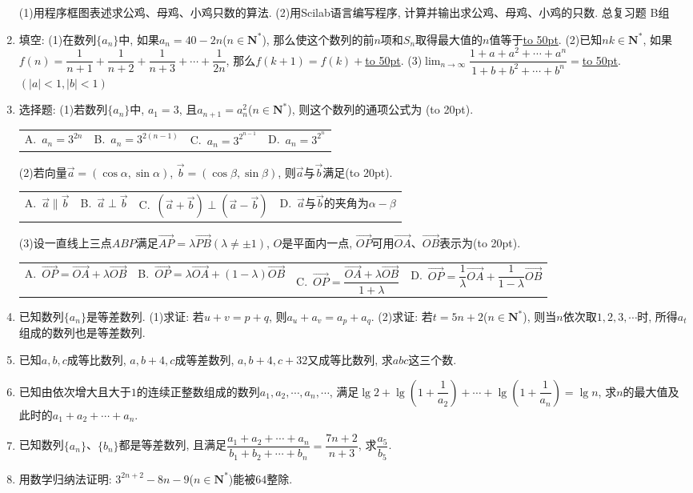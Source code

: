\documentclass[10pt,a4paper]{article}
\newcommand{\blank}[1]{\underline{\hbox to #1pt{}}}
\newcommand{\bracket}[1]{(\hbox to #1pt{})}
\newcommand{\fourch}[4]{\par\begin{tabular}{p{.23\textwidth}p{.23\textwidth}p{.23\textwidth}p{.23\textwidth}}
A.~#1 &B.~#2& C.~#3& D.~#4
\end{tabular}}
\begin{document}
\begin{enumerate}[1.]
(1)用程序框图表述求公鸡、母鸡、小鸡只数的算法.
(2)用Scilab语言编写程序, 计算并输出求公鸡、母鸡、小鸡的只数.
总复习题
B组
\item 填空:
(1)在数列$\{a_n\}$中, 如果$a_n=40-2n$($n\in \mathbf{N}^*$), 那么使这个数列的前$n$项和$S_n$取得最大值的$n$值等于\blank{50}.
(2)已知$nk\in \mathbf{N}^*$, 如果$f(n)=\dfrac 1{n+1}+\dfrac 1{n+2}+\dfrac 1{n+3}+\cdots +\dfrac 1{2n}$, 那么$f(k+1)=f(k)+$\blank{50}.
(3)$\displaystyle\lim_{n\to\infty}\dfrac{1+a+a^2+\cdots +a^n}{1+b+b^2+\cdots +b^n}=$\blank{50}.$(|a|<1,|b|<1)$
\item 选择题:
(1)若数列$\{a_n\}$中, $a_1=3$, 且$a_{n+1}=a_n^2$($n\in \mathbf{N}^*$), 则这个数列的通项公式为    \bracket{20}.
\fourch{$a_n=3^{2n}$}{$a_n=3^{2(n-1)}$}{$a_n=3^{2^{n-1}}$}{$a_n=3^{2^n}$}
(2)若向量$\overrightarrow a=(\cos \alpha ,\sin \alpha)$, $\overrightarrow b=(\cos \beta ,\sin \beta)$, 则$\overrightarrow a$与$\overrightarrow b$满足\bracket{20}.
\fourch{$\overrightarrow a\parallel \overrightarrow b$}{$\overrightarrow a\perp \overrightarrow b$}{$(\overrightarrow a+\overrightarrow b)\perp (\overrightarrow a-\overrightarrow b)$}{$\overrightarrow a$与$\overrightarrow b$的夹角为$\alpha -\beta$}
(3)设一直线上三点$ABP$满足$\overrightarrow{AP}=\lambda \overrightarrow{PB}(\lambda \ne \pm 1)$, $O$是平面内一点, $\overrightarrow{OP}$可用$\overrightarrow{OA}$、$\overrightarrow{OB}$表示为\bracket{20}.
\fourch{$\overrightarrow{OP}=\overrightarrow{OA}+\lambda \overrightarrow{OB}$}{$\overrightarrow{OP}=\lambda \overrightarrow{OA}+(1-\lambda)\overrightarrow{OB}$}{$\overrightarrow{OP}=\dfrac{\overrightarrow{OA}+\lambda \overrightarrow{OB}}{1+\lambda }$}{$\overrightarrow{OP}=\dfrac 1{\lambda }\overrightarrow{OA}+\dfrac 1{1-\lambda }\overrightarrow{OB}$}
\item 已知数列$\{a_n\}$是等差数列.
(1)求证: 若$u+v=p+q$, 则$a_u+a_v=a_p+a_q$.
(2)求证: 若$t=5n+2$($n\in \mathbf{N}^*$), 则当$n$依次取$1, 2, 3, \cdots$时, 所得$a_t$组成的数列也是等差数列.
\item 已知$a,b,c$成等比数列, $a,b+4,c$成等差数列, $a,b+4,c+32$又成等比数列, 求$abc$这三个数.
\item 已知由依次增大且大于$1$的连续正整数组成的数列$a_1,a_2,\cdots ,a_n,\cdots$, 满足$\lg 2+\lg (1+\dfrac 1{a_2})+\cdots +\lg (1+\dfrac 1{a_n})=\lg n$, 求$n$的最大值及此时的$a_1+a_2+\cdots +a_n$.
\item 已知数列$\{a_n\}$、$\{b_n\}$都是等差数列, 且满足$\dfrac{a_1+a_2+\cdots +a_n}{b_1+b_2+\cdots +b_n}=\dfrac{7n+2}{n+3}$, 求$\dfrac{a_5}{b_5}$.
\item 用数学归纳法证明: $3^{2n+2}-8n-9$($n\in \mathbf{N}^*$)能被$64$整除.

\end{enumerate}
\end{document}
